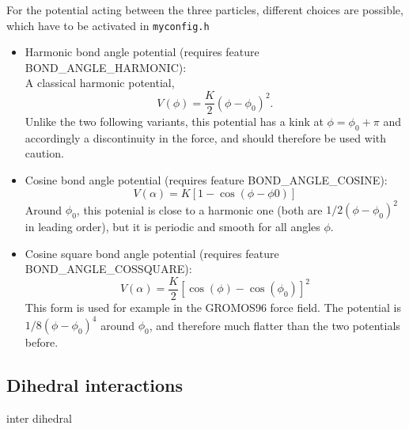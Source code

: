 For the potential acting between the three particles, different choices are
possible, which have to be activated in \texttt{myconfig.h}
\begin{itemize}
\item Harmonic bond angle potential (requires feature BOND_ANGLE_HARMONIC):\\
  A classical harmonic potential,
  \begin{equation}
    V(\phi) = \frac{K}{2} \left(\phi - \phi_0\right)^2.
  \end{equation}
  Unlike the two following variants, this potential has a kink at
  $\phi=\phi_0+\pi$ and accordingly a discontinuity in the force, and should
  therefore be used with caution.
\item Cosine bond angle potential (requires feature BOND_ANGLE_COSINE):\\
  \begin{equation}
    V(\alpha) = K \left[1 - \cos(\phi - \phi0)\right]
  \end{equation}
  Around $\phi_0$, this potenial is close to a harmonic one (both are
  $1/2(\phi-\phi_0)^2$ in leading order), but it is periodic and smooth for all
  angles $\phi$.
\item Cosine square bond angle potential (requires feature
  BOND_ANGLE_COSSQUARE):\\
  \begin{equation}
    V(\alpha) = \frac{K}{2} \left[\cos(\phi) - \cos(\phi_0)\right]^2
  \end{equation}
  This form is used for example in the GROMOS96 force field. The potential is
  $1/8(\phi-\phi_0)^4$ around $\phi_0$, and therefore much flatter than the
  two potentials before.
\end{itemize}

\subsection{Dihedral interactions}
\label{sec:dihedral}

\begin{essyntax}
  inter  dihedral   
\end{essyntax}

